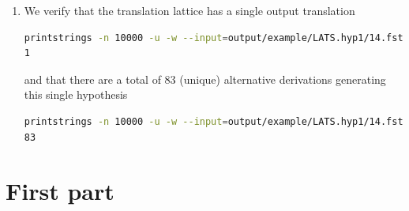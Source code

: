 \documentclass[a4paper,oneside,reqno]{amsart}
\begin{document}
\begin{enumerate}[label=\arabic*.]
  \item We verify that the translation lattice has a single output translation
    \begin{lstlisting}[language=bash]
printstrings -n 10000 -u -w --input=output/example/LATS.hyp1/14.fst.gz -p | wc -l
1
    \end{lstlisting}
    and that there are a total of 83 (unique) alternative derivations generating this
    single hypothesis
    \begin{lstlisting}[language=bash]
printstrings -n 10000 -u -w --input=output/example/LATS.hyp1/14.fst.gz | wc -l
83
    \end{lstlisting}


\end{enumerate}

\section{First part}
\end{document}
